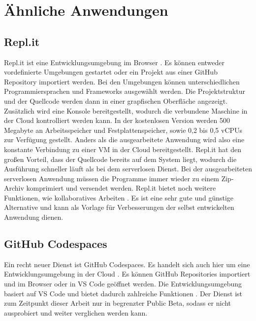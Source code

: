 \chapter{Ähnliche Anwendungen}

\section{Repl.it}
Repl.it ist eine Entwicklungsumgebung im Browser \cite{Replit}. Es können
entweder vordefinierte Umgebungen gestartet oder ein Projekt aus
einer GitHub Repository importiert werden. Bei den Umgebungen
können unterschiedlichen Programmiersprachen und Frameworks ausgewählt
werden. Die Projektstruktur und der Quellcode werden dann in einer grapfischen Oberfläche
angezeigt. Zusätzlich wird eine Konsole bereitgestellt, wodurch die
verbundene Maschine in der Cloud kontrolliert werden kann. In der kostenlosen
Version werden 500 Megabyte an Arbeitsspeicher und Festplattenspeicher,
sowie 0,2 bis 0,5 vCPUs zur Verfügung gestellt.
Anders als die ausgearbeitete Anwendung wird also eine konstante Verbindung
zu einer VM in der Cloud bereitgestellt.
Repl.it hat den großen Vorteil, dass der Quellcode bereits auf dem System liegt,
wodurch die Ausführung schneller läuft als bei dem serverlosen Dienst.
Bei der ausgearbeiteten serverlosen Anwendung müssen die Programme
immer wieder zu einem Zip-Archiv komprimiert und versendet werden.
Repl.it bietet noch weitere Funktionen, wie kollaboratives Arbeiten \cite{Replit}.
Es ist eine sehr gute und günstige Alternative und kann als Vorlage
für Verbesserungen der selbst entwickelten Anwendung dienen.

\section{GitHub Codespaces}
Ein recht neuer Dienst ist GitHub Codespaces.
Es handelt sich auch hier um eine Entwicklungsumgebung in der Cloud \cite{GithunCodespaces}.
Es können GitHub Repositories importiert und im Browser oder
in VS Code geöffnet werden. Die Entwicklungsumgebung
basiert auf VS Code und bietet dadurch zahlreiche Funktionen \cite{GithunCodespacesDocs}.
Der Dienst ist zum Zeitpunkt dieser Arbeit nur in begrenzter Public Beta, sodass
er nicht ausprobiert und weiter verglichen werden kann.